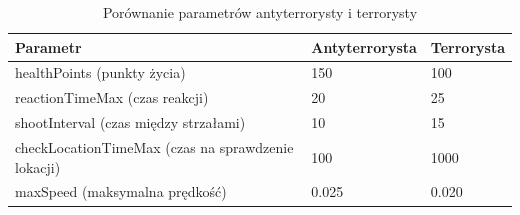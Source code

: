 \begin{table}
\begin{center}
\begin{tabular}{|p{} | p{} p{}|}
\hline
Parametr & Antyterrorysta & Terrorysta\\\hline
	healthPoints (punkty życia) & 150 & 100\\\hline
	reactionTimeMax (czas reakcji) & 20 & 25\\\hline
	shootInterval (czas między strzałami) & 10 & 15\\\hline
	checkLocationTimeMax (czas na sprawdzenie lokacji) & 100 & 1000\\\hline
	maxSpeed (maksymalna prędkość) & 0.025 & 0.020\\
\hline
\end{tabular}
\caption {Porównanie parametrów antyterrorysty i terrorysty\label{parameters}}
\end{center}
\end{table} 

